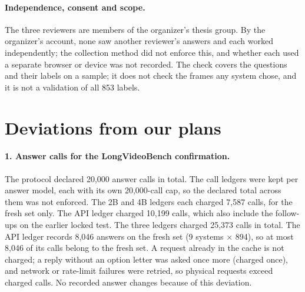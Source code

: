 \paragraph{Independence, consent and scope.}
The three reviewers are members of the organizer's thesis group.
By the organizer's account, none saw another reviewer's answers and each worked independently; the collection method did not enforce this, and whether each used a separate browser or device was not recorded.
The check covers the questions and their labels on a sample; it does not check the frames any system chose, and it is not a validation of all 853 labels.

\section{Deviations from our plans}
\label{sec:s-deviations}

\paragraph{1. Answer calls for the LongVideoBench confirmation.}
The protocol declared 20,000 answer calls in total.
The call ledgers were kept per answer model, each with its own 20,000-call cap, so the declared total across them was not enforced.
The 2B and 4B ledgers each charged 7,587 calls, for the fresh set only.
The API ledger charged 10,199 calls, which also include the follow-ups on the earlier locked test.
The three ledgers charged 25,373 calls in total.
The API ledger records 8,046 answers on the fresh set (9 systems $\times$ 894), so at most 8,046 of its calls belong to the fresh set.
A request already in the cache is not charged; a reply without an option letter was asked once more (charged once), and network or rate-limit failures were retried, so physical requests exceed charged calls.
No recorded answer changes because of this deviation.

